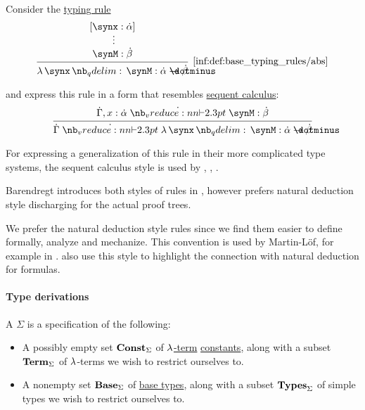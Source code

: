 \begin{remark}\label{rem:typing_rule_style}
  Consider the \hyperref[def:simple_typing_rule]{typing rule}
  \begin{equation*}
    \begin{prooftree}
      \hypo{ [\synx: \syn\alpha] }
      \ellipsis {} { \synM: \syn\beta }
      \infer1[\ref{inf:def:base_typing_rules/abs}]{ \qabs \synx \synM: \syn\alpha \synimplies \syn\beta }
    \end{prooftree}
  \end{equation*}

   and  express this rule in a form that resembles \hyperref[rem:sequent_calculus]{sequent calculus}:
  \begin{equation*}
    \begin{prooftree}
      \hypo{ \syn\Gamma, x: \syn\alpha \synvdash \synM: \syn\beta }
      \infer1{ \syn\Gamma \synvdash \qabs \synx \synM: \syn\alpha \synimplies \syn\beta }
    \end{prooftree}
  \end{equation*}

  For expressing a generalization of this rule in their more complicated type systems, the sequent calculus style is used by , , .

  Barendregt introduces both styles of rules in \cite[def. 3.1.3]{Barendregt1992Types}, however prefers natural deduction style discharging for the actual proof trees.

  We prefer the natural deduction style rules since we find them easier to define formally, analyze and mechanize. This convention is used by Martin-L\"of, for example in \cite{MartinLöf1984IntTypeTheory}.  also use this style to highlight the connection with natural deduction for formulas.
\end{remark}

\paragraph{Type derivations}

\begin{definition}\label{def:simple_type_signature}\mimprovised
  A  \( \Sigma \) is a specification of the following:
  \begin{itemize}
    \item A possibly empty set \( \op*{Const}_\Sigma \) of \hyperref[def:lambda_term]{\( \mathrm{\lambda} \)-term} \hyperref[def:lambda_term/const]{constants}, along with a subset \( \op*{Term}_\Sigma \) of \( \mathrm{\lambda} \)-terms we wish to restrict ourselves to.

    \item A nonempty set \( \op*{Base}_\Sigma \) of \hyperref[def:simple_type]{base types}, along with a subset \( \op*{Types}_\Sigma \) of simple types we wish to restrict ourselves to.
  \end{itemize}
\end{definition}

